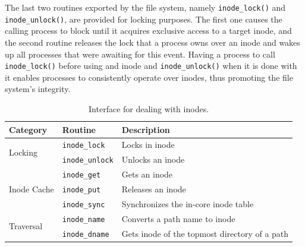 \documentclass[10pt,a4paper]{article}
\begin{document}
The last two routines exported by the file system, namely \texttt{inode\_lock()} and \texttt{inode\_unlock()}, are provided for locking purposes. The first one causes the calling process to block until it acquires exclusive access to a target inode, and the second routine releases the lock that a process owns over an inode and wakes up all processes that were awaiting for this event. Having a process to call \texttt{inode\_lock()} before using and inode and \texttt{inode\_unlock()} when it is done with it enables processes to consistently operate over inodes, thus promoting the file system's integrity.

\begin{table}
\small
\centering
\caption{Interface for dealing with inodes.}
\label{table: inodes interface}
\begin{tabular}{l l l}
	\toprule
	Category & Routine & Description \\
	\midrule
	\multirow{2}{*}{Locking}
	                               & \texttt{inode\_lock}     & Locks in inode                                \\
	                               & \texttt{inode\_unlock}   & Unlocks an inode                              \\
	\midrule
	\multirow{3}{*}{Inode Cache}
	                               & \texttt{inode\_get}      & Gets an inode                                  \\
	                               & \texttt{inode\_put}      & Releases an inode                              \\
	                               & \texttt{inode\_sync}     & Synchronizes the in-core inode table           \\
	\midrule
	\multirow{2}{*}{Traversal}
	                               & \texttt{inode\_name}     & Converts a path name to inode                  \\
	                               & \texttt{inode\_dname}    & Gets inode of the topmost directory of a path  \\
	\bottomrule
\end{tabular}
\end{table}

\printbibliography
\end{document}
